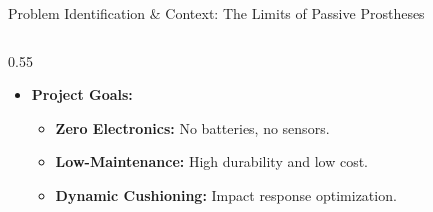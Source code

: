 \begin{frame}{Problem Identification \& Context: The Limits of Passive Prostheses}
\begin{columns}[T]
\begin{column}{0.55\textwidth}
\begin{itemize}
\begin{itemize}
                \end{itemize}
                \item \textbf{Project Goals:}
                \begin{itemize}
                    \item \textbf{Zero Electronics:} No batteries, no sensors.
                    \item \textbf{Low-Maintenance:} High durability and low cost.
                    \item \textbf{Dynamic Cushioning:} Impact response optimization.
                \end{itemize}
            \end{itemize}
        \end{column}
    \end{columns}
\end{frame}